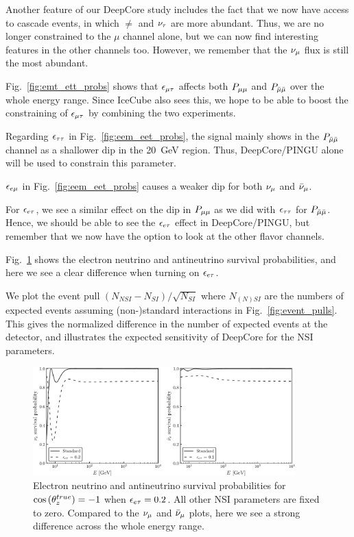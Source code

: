 Another feature of our DeepCore study includes the fact that we now have access to cascade events, in which $\ne$ and $\nu_\tau$ are more abundant.
Thus, we are no longer constrained to the $\mu$ channel alone, but we can now find interesting features in the other channels too. However, we 
remember that the $\nu_\mu$ flux is still the most abundant.

Fig.~\ref{fig:emt_ett_probs} shows that $\epsilon_{\mu\tau}$ affects both $P_{\mu\mu}$ and $P_{\bar{\mu} \bar{\mu}}$ over the whole energy range. Since 
IceCube also sees this, we hope to be able to boost the constraining of $\epsilon_{\mu\tau}$ by combining the two experiments.

Regarding $\epsilon_{\tau\tau}$ in Fig.~\ref{fig:eem_eet_probs}, the signal mainly shows in the $P_{\bar{\mu} \bar{\mu}}$ channel as
a shallower dip in the \SI{20}{\GeV} region. Thus, DeepCore/PINGU alone will be used to constrain this parameter.

$\epsilon_{e\mu}$ in Fig.~\ref{fig:eem_eet_probs} causes a weaker dip for both $\nu_\mu$ and $\bar{\nu}_\mu$. 

For $\epsilon_{e\tau}$, we see a similar effect on the dip in $P_{\mu\mu}$ as we did with $\epsilon_{\tau\tau}$ for $P_{\bar{\mu} \bar{\mu}}$. Hence, we should be able to 
see the $\epsilon_{e\tau}$ effect in DeepCore/PINGU, but remember that we now have the option to look at the other flavor channels.

Fig.~\ref{fig:Pee_eet_probs} shows the electron neutrino and antineutrino survival probabilities, and here we see
a clear difference when turning on $\epsilon_{e\tau}$.

We plot the event pull $(N_{NSI} - N_{SI})/\sqrt{N_{SI}}$ where $N_{(N)SI}$ are the numbers of expected events
assuming (non-)standard interactions in Fig.~\ref{fig:event_pulls}. This gives the normalized difference in the
number of expected events at the detector, and illustrates the expected sensitivity of DeepCore for the NSI parameters.

\begin{figure}
    \begin{center}
        \includegraphics[width=0.9\textwidth]{figures/Pee_eet_probs.pdf}
        \caption{Electron neutrino and antineutrino survival probabilities for
        $\cos{(\theta_z^{true})} = -1$ when $\epsilon_{e\tau} = 0.2$. All other NSI parameters are fixed to zero. Compared to the $\nu_\mu$ and $\bar{\nu}_\mu$ plots, here we see a strong difference across the whole energy range.}
        \label{fig:Pee_eet_probs}
    \end{center}
\end{figure}

